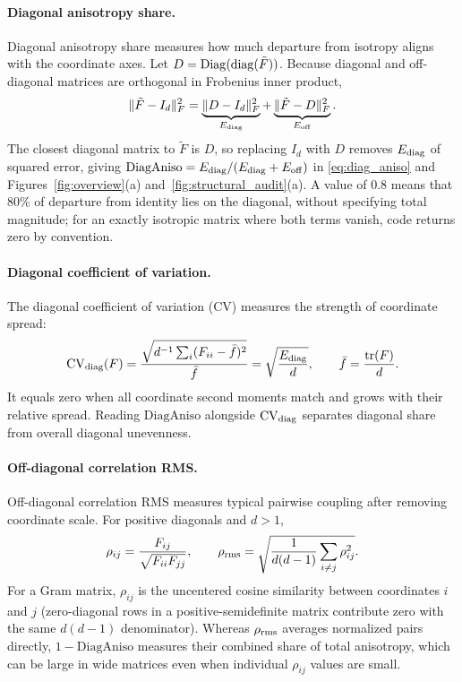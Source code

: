 \paragraph{Diagonal anisotropy share.}
Diagonal anisotropy share measures how much departure from isotropy aligns with the coordinate axes. Let $D=\operatorname{Diag}(\operatorname{diag}(\tilde F))$. Because diagonal and off-diagonal matrices are orthogonal in Frobenius inner product,
\[
 \|\tilde F-I_d\|_F^2
 =\underbrace{\|D-I_d\|_F^2}_{E_{\rm diag}}
 +\underbrace{\|\tilde F-D\|_F^2}_{E_{\rm off}}.
\]
The closest diagonal matrix to $\tilde F$ is $D$, so replacing $I_d$ with $D$ removes $E_{\rm diag}$ of squared error, giving $\mathrm{DiagAniso}=E_{\rm diag}/(E_{\rm diag}+E_{\rm off})$ in \cref{eq:diag_aniso} and Figures~\ref{fig:overview}(a) and~\ref{fig:structural_audit}(a). A value of $0.8$ means that 80\% of departure from identity lies on the diagonal, without specifying total magnitude; for an exactly isotropic matrix where both terms vanish, code returns zero by convention.

\paragraph{Diagonal coefficient of variation.}
The diagonal coefficient of variation (CV) measures the strength of coordinate spread:
\[
 \mathrm{CV}_{\rm diag}(F)
 =\frac{\sqrt{d^{-1}\sum_i(F_{ii}-\bar f)^2}}{\bar f}
 =\sqrt{\frac{E_{\rm diag}}{d}},
 \qquad \bar f=\frac{\operatorname{tr}(F)}{d}.
\]
It equals zero when all coordinate second moments match and grows with their relative spread. Reading $\mathrm{DiagAniso}$ alongside $\mathrm{CV}_{\rm diag}$ separates diagonal share from overall diagonal unevenness.

\paragraph{Off-diagonal correlation RMS.}
Off-diagonal correlation RMS measures typical pairwise coupling after removing coordinate scale. For positive diagonals and $d>1$,
\[
 \rho_{ij}=\frac{F_{ij}}{\sqrt{F_{ii}F_{jj}}},\qquad
 \rho_{\rm rms}=\sqrt{\frac{1}{d(d-1)}\sum_{i\ne j}\rho_{ij}^2}.
\]
For a Gram matrix, $\rho_{ij}$ is the uncentered cosine similarity between coordinates $i$ and $j$ (zero-diagonal rows in a positive-semidefinite matrix contribute zero with the same $d(d-1)$ denominator). Whereas $\rho_{\rm rms}$ averages normalized pairs directly, $1-\mathrm{DiagAniso}$ measures their combined share of total anisotropy, which can be large in wide matrices even when individual $\rho_{ij}$ values are small.

